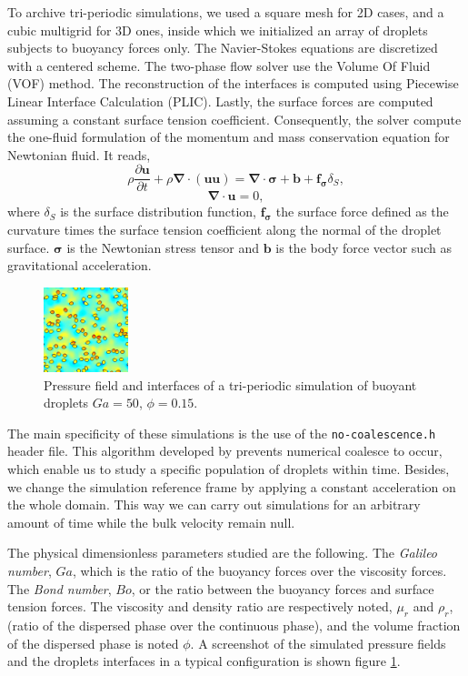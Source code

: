 \documentclass[twocolumn,a4paper,10pt]{scrartcl}
\begin{document}
To archive tri-periodic simulations, we used a square mesh for 2D cases, and a cubic multigrid for 3D ones,
inside which we initialized an array of droplets subjects to buoyancy forces only. 
The Navier-Stokes equations are discretized with a centered scheme. 
The two-phase flow solver use the Volume Of Fluid (VOF) method.
The reconstruction of the interfaces is computed using Piecewise Linear Interface Calculation (PLIC). 
Lastly, the surface forces are computed assuming a constant surface tension coefficient. 
Consequently, the solver compute the one-fluid formulation of the momentum and mass conservation equation for Newtonian fluid. 
It reads,
\begin{equation}
    \rho \frac{\partial \bm{u}}{\partial t} +\rho \bm{\nabla}\cdot(\bm{uu}) = \bm{\nabla} \cdot \bm{\sigma} + \bm{b} + \bm{f_\sigma} \delta_S,
\end{equation}
\begin{equation}
    \bm{\nabla} \cdot \bm{u} = 0,
\end{equation}
where $\delta_S$ is the surface distribution function, $\bm{f_\sigma}$ the surface force defined as the curvature times the surface tension coefficient along the normal of the droplet surface. 
$\bm{\sigma}$ is the Newtonian stress tensor and $\bm{b}$ is the body force vector such as gravitational acceleration.
\begin{figure}[h!]
    \centering
    \includegraphics[width = 0.22\textwidth]{image/pic/bulles.png}
    \caption{Pressure field and interfaces of a tri-periodic simulation of buoyant droplets $Ga = 50$, $\phi = 0.15$.}
    \label{fig:pic}
\end{figure}
The main specificity of these simulations is the use of the \texttt{no-coalescence.h} header file.
This algorithm developed by \citep{mani2021numerical} prevents numerical coalesce to occur, which enable us to study a specific population of droplets within time.
Besides, we change the simulation reference frame by applying a constant acceleration on the whole domain.
This way we can carry out simulations for an arbitrary amount of time while the bulk velocity remain null. 

The physical dimensionless parameters studied are the following.
The \textit{Galileo number}, $Ga$, which is the ratio of the buoyancy forces over
the viscosity forces.
The \textit{Bond number}, $Bo$, or the ratio between the buoyancy forces and surface tension forces.
The viscosity and density ratio are respectively noted, $\mu_r$ and $\rho_r$,(ratio of the dispersed phase over the continuous phase),
and the volume fraction of the dispersed phase is noted $\phi$. 
A screenshot of the simulated pressure fields and the droplets interfaces in a typical configuration is shown figure \ref{fig:pic}.
\end{document}

